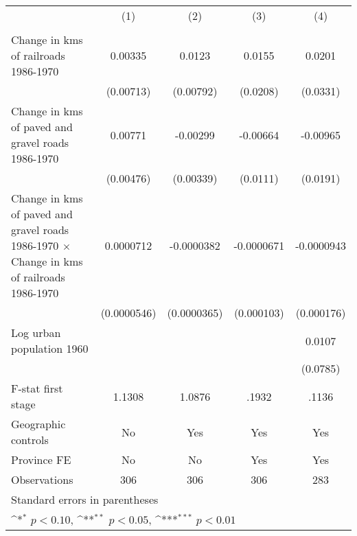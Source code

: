 {
\def\sym#1{\ifmmode^{#1}\else\(^{#1}\)\fi}
\begin{tabular}{l*{4}{c}}
\hline\hline
                &\multicolumn{1}{c}{(1)}&\multicolumn{1}{c}{(2)}&\multicolumn{1}{c}{(3)}&\multicolumn{1}{c}{(4)}\\
                &\multicolumn{1}{c}{}&\multicolumn{1}{c}{}&\multicolumn{1}{c}{}&\multicolumn{1}{c}{}\\
\hline
Change in kms of railroads 1986-1970&  0.00335         &   0.0123         &   0.0155         &   0.0201         \\
                &(0.00713)         &(0.00792)         & (0.0208)         & (0.0331)         \\
[1em]
Change in kms of paved and gravel roads 1986-1970&  0.00771         & -0.00299         & -0.00664         & -0.00965         \\
                &(0.00476)         &(0.00339)         & (0.0111)         & (0.0191)         \\
[1em]
Change in kms of paved and gravel roads 1986-1970 $\times$ Change in kms of railroads 1986-1970&0.0000712         &-0.0000382         &-0.0000671         &-0.0000943         \\
                &(0.0000546)         &(0.0000365)         &(0.000103)         &(0.000176)         \\
[1em]
Log urban population 1960&                  &                  &                  &   0.0107         \\
                &                  &                  &                  & (0.0785)         \\
\hline
F-stat first stage&   1.1308         &   1.0876         &    .1932         &    .1136         \\
Geographic controls&       No         &      Yes         &      Yes         &      Yes         \\
Province FE     &       No         &       No         &      Yes         &      Yes         \\
Observations    &      306         &      306         &      306         &      283         \\
\hline\hline
\multicolumn{5}{l}{\footnotesize Standard errors in parentheses}\\
\multicolumn{5}{l}{\footnotesize \sym{*} \(p<0.10\), \sym{**} \(p<0.05\), \sym{***} \(p<0.01\)}\\
\end{tabular}
}

